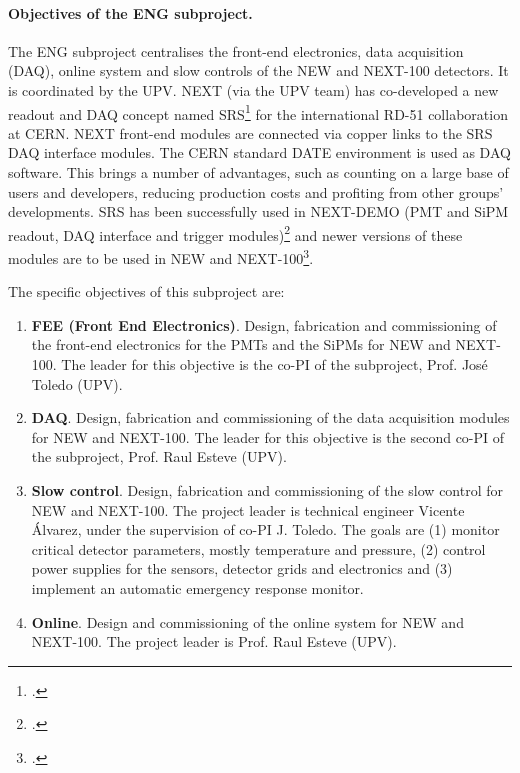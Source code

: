 \paragraph{Objectives of the ENG subproject.}

The ENG subproject centralises the front-end electronics, data acquisition (DAQ), online system and slow controls of the NEW and NEXT-100 detectors. It is coordinated by the UPV. NEXT (via the UPV team) has co-developed a new readout and DAQ concept named SRS\footcite{Toledo2011,SRS2013} for the international RD-51 collaboration at CERN. NEXT front-end modules are connected via copper links to the SRS DAQ interface modules. The CERN standard DATE environment is used as DAQ software. This brings a number of advantages, such as counting on a large base of users and developers, reducing production costs and profiting from other groups' developments. SRS has been successfully used in NEXT-DEMO (PMT and SiPM readout, DAQ interface and trigger modules)\footcite{Gil2012,Herrero2012,Esteve2012} and newer versions of these modules are to be used in NEW and NEXT-100\footcite{TWEPP2014}.

The specific objectives of this subproject are:

\begin{enumerate}

\item {\bf FEE (Front End Electronics)}. Design, fabrication and commissioning of the front-end electronics for the PMTs and the SiPMs for NEW and NEXT-100. The leader for this objective is the co-PI of the subproject, Prof. Jos\'e Toledo (UPV).
 
\item {\bf DAQ}. Design, fabrication and commissioning of the data acquisition modules for NEW and NEXT-100. The leader for this objective is the second co-PI of the subproject, Prof. Raul Esteve (UPV).

\item {\bf Slow control}. Design, fabrication and commissioning of the slow control for NEW and NEXT-100. The project leader is technical engineer Vicente Álvarez, under the supervision of co-PI J. Toledo. The goals are (1) monitor critical detector parameters, mostly temperature and pressure, (2) control power supplies for the sensors, detector grids and electronics and (3) implement an automatic emergency response monitor.

\item {\bf Online}. Design and commissioning of the online system for NEW and NEXT-100. The project leader is Prof. Raul Esteve (UPV). 

\end{enumerate}